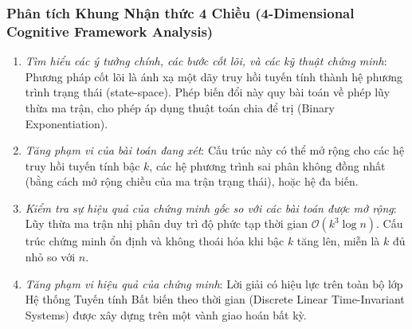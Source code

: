 \documentclass{article}
\begin{document}
\subsubsection*{Phân tích Khung Nhận thức 4 Chiều (4-Dimensional Cognitive Framework Analysis)}
\begin{enumerate}
 \item \textit{Tìm hiểu các ý tưởng chính, các bước cốt lõi, và các kỹ thuật chứng minh}: Phương pháp cốt lõi là ánh xạ một dãy truy hồi tuyến tính thành hệ phương trình trạng thái (state-space). Phép biến đổi này quy bài toán về phép lũy thừa ma trận, cho phép áp dụng thuật toán chia để trị (Binary Exponentiation).
 \item \textit{Tăng phạm vi của bài toán đang xét}: Cấu trúc này có thể mở rộng cho các hệ truy hồi tuyến tính bậc $k$, các hệ phương trình sai phân không đồng nhất (bằng cách mở rộng chiều của ma trận trạng thái), hoặc hệ đa biến.
 \item \textit{Kiểm tra sự hiệu quả của chứng minh gốc so với các bài toán được mở rộng}: Lũy thừa ma trận nhị phân duy trì độ phức tạp thời gian $\mathcal{O}(k^3 \log n)$. Cấu trúc chứng minh ổn định và không thoái hóa khi bậc $k$ tăng lên, miễn là $k$ đủ nhỏ so với $n$.
 \item \textit{Tăng phạm vi hiệu quả của chứng minh}: Lời giải có hiệu lực trên toàn bộ lớp Hệ thống Tuyến tính Bất biến theo thời gian (Discrete Linear Time-Invariant Systems) được xây dựng trên một vành giao hoán bất kỳ.
\end{enumerate}

\end{document}
